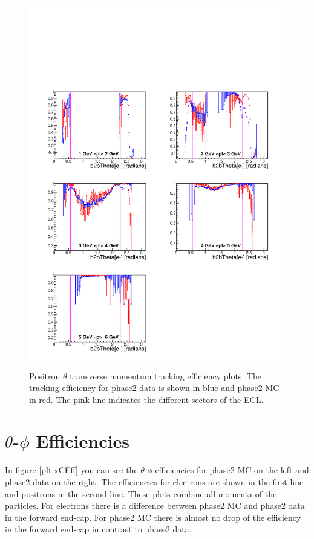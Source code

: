 \documentclass[a4paper,11pt,twosided,final,german,openbib,pdftex,listof=totoc,bibliography=totoc]{scrbook}
\begin{document}
\begin{figure}[!htbp]
	\centering
	\includegraphics[width=\textwidth]{Plots/master/xPtMThetaep}
	\caption[Transverse Momentum $\theta$ Positron Efficiency Phase2]{Positron $\theta$ transverse momentum tracking efficiency plots. The tracking efficiency for phase2 data is shown in blue and phase2 MC in red. The pink line indicates the different sectors of the ECL.}
	\label{plt:xPtMThetaep}
\end{figure}

\newpage

\section{$\theta$-$\phi$ Efficiencies}
\label{sec:tpEff}

In figure \ref{plt:xCEff} you can see the $\theta$-$\phi$ efficiencies for phase2 MC on the left and phase2 data on the right. The efficiencies for electrons are shown in the first line and positrons in the second line. These plots combine all momenta of the particles. For electrons there is a difference between phase2 MC and phase2 data in the forward end-cap. For phase2 MC there is almost no drop of the efficiency in the forward end-cap in contrast to phase2 data. 
\end{document}
